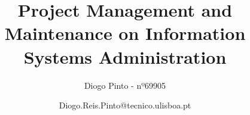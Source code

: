 \documentclass{./llncs2e/llncs}
\begin{document}
\title{Project Management and Maintenance on Information Systems Administration}

\subtitle{Diogo Pinto - nº69905}
\author{Diogo.Reis.Pinto@tecnico.ulisboa.pt}

\maketitle










\newpage
\appendix




% 
% 
 

 
\end{document}
